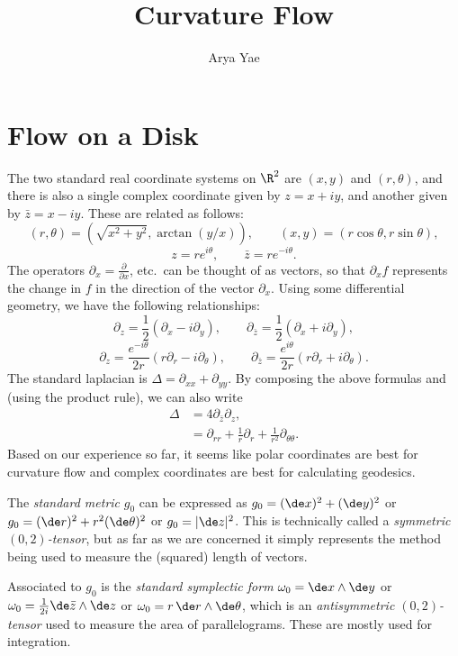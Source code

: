 \documentclass{article}
\title{Curvature Flow}
\author{Arya Yae}
\date{}
\begin{document}
\maketitle

\section*{Flow on a Disk}
The two standard real coordinate systems on $\R^2$ are $(x,y)$ and $(r,\theta)$, and there is also a single complex coordinate given by $z=x+iy$, and another given by $\bar z=x-iy$.  These are related as follows:
    $$(r,\theta)=(\sqrt{x^2+y^2},\arctan(y/x)),\qquad (x,y)=(r\cos\theta,r\sin\theta),$$
    $$z=re^{i\theta},\qquad \bar z=re^{-i\theta}.$$
The operators $\partial_x=\frac{\partial}{\partial x}$, etc.\ can be thought of as vectors, so that $\partial_x f$ represents the change in $f$ in the direction of the vector $\partial_x$.  Using some differential geometry, we have the following relationships:
    $$\partial_z=\frac12(\partial_x-i\partial_y),\qquad \partial_{\bar z}=\frac12(\partial_x+i\partial_y),$$
    $$\partial_z=\frac{e^{-i\theta}}{2r}(r\partial_r-i\partial_\theta),\qquad \partial_{\bar z}=\frac{e^{i\theta}}{2r}(r\partial_r+i\partial_\theta).$$
The standard laplacian is $\Delta=\partial_{xx}+\partial_{yy}$.  By composing the above formulas and (using the product rule), we can also write
\begin{align}
    \Delta
        &=4\partial_{\bar z}\partial_z,\\
        &=\partial_{rr}+\frac1r\partial_r+\frac1{r^2}\partial_{\theta\theta}.
\end{align}
Based on our experience so far, it seems like polar coordinates are best for curvature flow and complex coordinates are best for calculating geodesics.

The \emph{standard metric} $g_0$ can be expressed as $g_0=(\de x)^2+(\de y)^2$ or $g_0=(\de r)^2+r^2(\de\theta)^2$ or $g_0=|\de z|^2$.  This is technically called a \emph{symmetric $(0,2)$-tensor}, but as far as we are concerned it simply represents the method being used to measure the (squared) length of vectors.

Associated to $g_0$ is the \emph{standard symplectic form} $\omega_0=\de x\wedge\de y$ or $\omega_0=\frac1{2i}\de\bar z\wedge\de z$ or $\omega_0=r\,\de r\wedge\de\theta$, which is an \emph{antisymmetric $(0,2)$-tensor} used to measure the area of parallelograms.  These are mostly used for integration.
\end{document}
